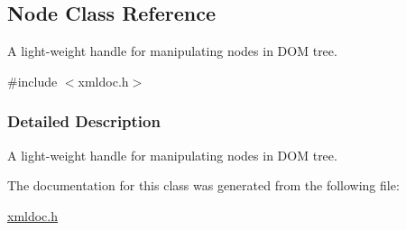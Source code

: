 \hypertarget{classNode}{
\subsection{Node Class Reference}
\label{classNode}
}


A light-\/weight handle for manipulating nodes in DOM tree.  




{\ttfamily \#include $<$xmldoc.h$>$}



\subsubsection{Detailed Description}
A light-\/weight handle for manipulating nodes in DOM tree. 

The documentation for this class was generated from the following file:\begin{DoxyCompactItemize}
\item 
\hyperlink{xmldoc_8h}{xmldoc.h}\end{DoxyCompactItemize}
